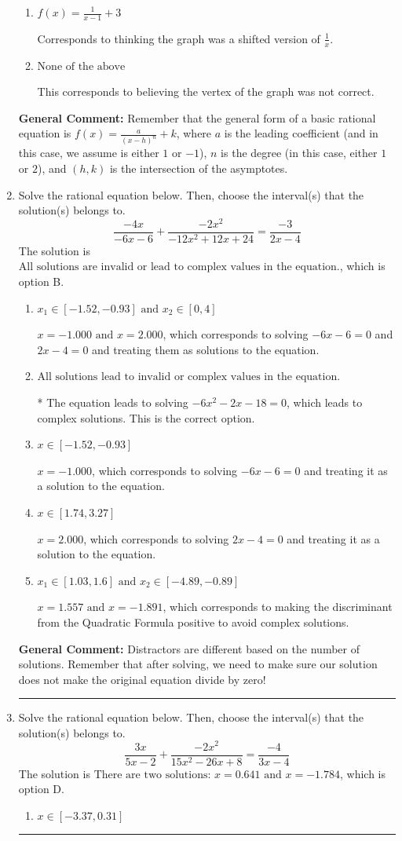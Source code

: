 \documentclass{extbook}[14pt]
\newcommand{\litem}[1]{\item #1

\rule{\textwidth}{0.4pt}}
\begin{document}
\begin{enumerate}
{\begin{enumerate}[label=\Alph*.]
This is the correct option.
\item \( f(x) = \frac{1}{x - 1} + 3 \)

Corresponds to thinking the graph was a shifted version of $\frac{1}{x}$.
\item \( \text{None of the above} \)

This corresponds to believing the vertex of the graph was not correct.
\end{enumerate}

\textbf{General Comment:} Remember that the general form of a basic rational equation is $ f(x) = \frac{a}{(x-h)^n} + k$, where $a$ is the leading coefficient (and in this case, we assume is either $1$ or $-1$), $n$ is the degree (in this case, either $1$ or $2$), and $(h, k)$ is the intersection of the asymptotes.
}
\litem{
Solve the rational equation below. Then, choose the interval(s) that the solution(s) belongs to.
\[ \frac{-4x}{-6x -6} + \frac{-2x^{2}}{-12x^{2} +12 x + 24} = \frac{-3}{2x -4} \]The solution is \( \text{All solutions are invalid or lead to complex values in the equation.} \), which is option B.\begin{enumerate}[label=\Alph*.]
\item \( x_1 \in [-1.52, -0.93] \text{ and } x_2 \in [0,4] \)

$x = -1.000 \text{ and } x = 2.000$, which corresponds to solving $-6x -6 = 0$ and $2x -4 = 0$ and treating them as solutions to the equation.
\item \( \text{All solutions lead to invalid or complex values in the equation.} \)

* The equation leads to solving $-6x^{2} -2 x -18=0$, which leads to complex solutions. This is the correct option.
\item \( x \in [-1.52,-0.93] \)

$x = -1.000$, which corresponds to solving $-6x -6 = 0$ and treating it as a solution to the equation.
\item \( x \in [1.74,3.27] \)

$x = 2.000$, which corresponds to solving $2x -4 = 0$ and treating it as a solution to the equation.
\item \( x_1 \in [1.03, 1.6] \text{ and } x_2 \in [-4.89,-0.89] \)

$x = 1.557 \text{ and } x = -1.891$, which corresponds to making the discriminant from the Quadratic Formula positive to avoid complex solutions.
\end{enumerate}

\textbf{General Comment:} Distractors are different based on the number of solutions. Remember that after solving, we need to make sure our solution does not make the original equation divide by zero!
}
\litem{
Solve the rational equation below. Then, choose the interval(s) that the solution(s) belongs to.
\[ \frac{3x}{5x -2} + \frac{-2x^{2}}{15x^{2} -26 x + 8} = \frac{-4}{3x -4} \]The solution is \( \text{There are two solutions: } x = 0.641 \text{ and } x = -1.784 \), which is option D.\begin{enumerate}[label=\Alph*.]
\item \( x \in [-3.37,0.31] \)



\end{enumerate}}
\end{enumerate}
\end{document}
